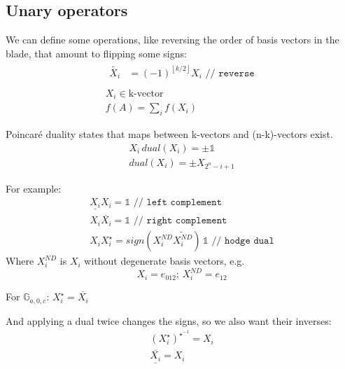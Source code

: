 \documentclass[twoside]{article}
\newcommand{\T}[1]{\textrm{#1}} %
\newcommand{\plusminus}{\pm}
\newcommand{\floor}[1]{{\left\lfloor{#1}\right\rfloor}}
\newcommand{\aside}[1]{\begin{flushright}\scriptsize{#1}\end{flushright}}
\begin{document}
\begin{multicols*}{2}
        \section{Unary operators}
            \par
                We can define some operations, like reversing the order of
                basis vectors in the blade, that amount to flipping some signs:
                \begin{gather*}
                    \begin{aligned}
                        \tilde{X_i} &= (-1)^\floor{k/2} X_i \texttt{ // reverse} \\
                    \end{aligned} \\
                    X_i \in \T{k-vector} \\
                    f(A) = \sum_i f(X_i)
                \end{gather*}
            \par
                Poincaré duality states that maps between k-vectors and (n-k)-vectors exist.
                \begin{gather*}
                    X_i \, dual(X_i) = \plusminus \mathbb{1} \\
                    dual(X_i) = \plusminus X_{2^n-i+1}
                \end{gather*}
            \par
                For example:
                \begin{gather*}
                    \underline{X_i} X_i = \mathbb{1} \texttt{ // left complement} \\
                    X_i \overline{X_i} = \mathbb{1} \texttt{ // right complement} \\
                    X_i X_i^\star = sign(X^{ND}_i \widetilde{X^{ND}_i}) \, \mathbb{1} \texttt{ // hodge dual}
                \end{gather*}
                Where $ X^{ND}_i $ is $ X_i $ without degenerate basis vectors, e.g.
                $$ X_i = e_{012}; \, X^{ND}_i = e_{12} $$
                \aside{For $ \mathbb{G}_{a,0,c} $: $ X_i^\star = \overline{X_i} $}
            \par
                And applying a dual twice changes the signs,
                so we also want their inverses:
                \begin{gather*}
                    (X_i^\star)^{\star^{-1}} = X_i \\
                    \underline{\overline{X_i}} = X_i

\end{gather*}
\end{multicols*}
\end{document}
